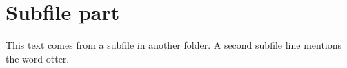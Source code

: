 \documentclass[../main.tex]{subfiles}
\begin{document}
\section{Subfile part}
This text comes from a subfile in another folder.
A second subfile line mentions the word otter.
\end{document}
